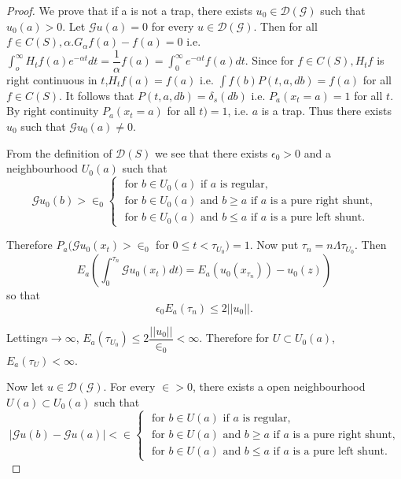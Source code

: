 \begin{proof}
  We prove that if a is not a trap, there exists $u_0 \in \mathscr{D}
  (\mathscr{G})$ such that $ u_0 (a) > 0$. Let $\mathscr{G} u(a) = 0$
  for every $u \in \mathscr{D}(\mathscr{G})$. Then for all $f \in C
  (S), \alpha. G_\alpha f(a) - f(a)=0 $ i.e. $\int^\infty_o H_t f(a)
  e^{- \alpha t } dt = \dfrac{1}{\alpha} f(a) = \int^\infty_0 e^{-
    \alpha t} f(a)dt$. Since for $f \in C(S), H_t f$ is right
  continuous in $t$,\break $H_t f(a)= f(a)$ i.e. $\int f(b) P(t, a, db)= f(a)
  $ for all $f \in C(S)$. It follows that $P(t, a, db) = \delta_s (db)
  $ i.e. 
  $P_a(x_t = a)= 1$ for all $t$. By right continuity $P_a (x_t = a)$
  for all $t) =1$, i.e. $a$ is a trap. Thus there exists $u_0$ such
  that $\mathscr{G} u_0 (a) \neq 0$. 

From the definition of $\mathscr{D} (S)$ we see that there exists
$\epsilon_0 > 0$ and a neighbourhood $U_0 (a)$ such that  
\begin{equation*}
  \mathscr{G}u_0 (b) > \in_0 
  \begin{cases}
    \text{ for } b \in U_0 (a) \text{ if } a \text{ is regular, } \\
    \text{ for } b \in U_0 (a) \text{ and } b \geq a \text{ if $a$ is
      a pure right shunt,}\\ 
    \text{ for } b \in U_0 (a) \text{ and } b \leq a \text{ if $a$ is
      a pure left shunt.} 
  \end{cases}
\end{equation*}

Therefore $P_a (\mathscr{G} u_0 (x_t) > \in_0$ for $0 \leq t <
\tau_{U_0}) = 1$. Now put $\tau_n = n \Lambda \tau_{U_0}$. Then 
$$
E_a \left(\int^{\tau_n}_{0} \mathscr{G} u_0 (x_t)dt)= E_a(u_0
  (x_{\tau_n}))-u_0 (z)\right)
$$
so that 
$$ 
\epsilon_0 E_a (\tau_n) \leq 2 || u_0 ||.
$$

Letting\pageoriginale $n \to \infty$, $E_a (\tau_{U_0}) \leq 2
\dfrac{||u_0||}{\in_0} < \infty$. Therefore for $U \subset U_0 (a)$,
$E_a (\tau_U) < \infty$. 

Now let $u \in \mathscr{D} (\mathscr{G})$. For every $\in > 0$, there
exists a open neighbourhood $U (a) \subset U_0 (a)$ such that 
{\fontsize{10pt}{12pt}\selectfont
\begin{equation*}
  | \mathscr{G}u (b) - \mathscr{G} u (a) | < \in 
  \begin{cases}
    \text{ for } b \in U(a) \text{ if } a \text{ is regular, } \\
    \text{ for } b \in U(a) \text{ and } b \geq a \text{ if $a$ is a
      pure right shunt,}\\ 
    \text{ for } b \in U(a) \text{ and } b \leq a \text{ if $a$ is a
      pure left shunt.} 
  \end{cases}
\end{equation*}}\relax


\end{proof}
